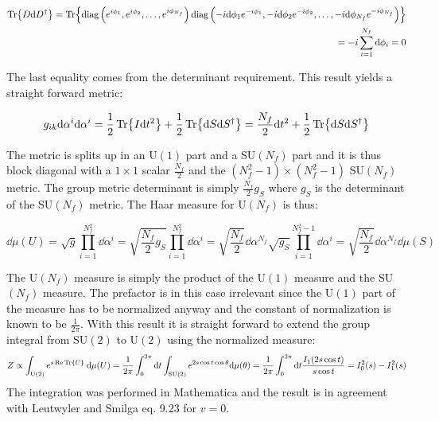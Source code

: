 \documentclass[a4,10pt,titlepage]{article}
\renewcommand\[{\begin{equation*}}
\renewcommand\]{\end{equation*}}
\newcommand{\be}{\begin{equation}}
\newcommand{\ee}{\end{equation}}
\numberwithin{equation}{section}
\newcommand{\lp}{\left}
\newcommand{\rp}{\right}
\newcommand{\half}{\frac{1}{2}}
\begin{document}
\be
\begin{split}
\Tr{D\dd D^\dagger}=\Tr{\text{diag}\lp(e^{i\phi_1},e^{i\phi_2},\ldots, e^{i\phi_{N_f}}\rp)\text{diag}\lp(-i\dd \phi_1 e^{-i\phi_1},-i\dd \phi_2 e^{-i\phi_2},\ldots, -i\dd \phi_{N_f}e^{-i\phi_{N_f}}\rp)} \\ 
=-i\sum_{i=1}^{N_f}\dd\phi_i=0
\end{split}
\ee

The last equality comes from the determinant requirement. This result yields a straight forward metric:

\be
g_{ik}\dd\alpha^i\dd\alpha^i=\half\Tr{I\dd t^2}+\half\Tr{\dd S\dd S^\dagger}=\frac{
N_f}{2}\dd t^2+\half\Tr{\dd S\dd S^\dagger}
\ee

The metric is splits up in an U$(1)$ part and a SU$(N_f)$ part and it is thus block diagonal with a $1\times1$ scalar $\frac{N_f}{2}$ and the $\lp(N_f^2-1\rp)\times\lp(N_f^2-1\rp)$ SU$(N_f)$ metric. The group metric determinant is simply $\frac{N_f}{2}g_{S}$ where $g_{S}$ is the determinant of the SU$(N_f)$ metric. The Haar measure for U$(N_f)$ is thus:

\be
\dd\mu(U)=\sqrt{g}\prod_{i=1}^{N_f^2}\dd\alpha^i=\sqrt{\frac{N_f}{2}g_{S}}\prod_{i=1}^{N_f^2}\dd\alpha^i=\sqrt{\frac{N_f}{2}}\dd\alpha^{N_f}\sqrt{g_S}\prod_{i=1}^{N_f^2-1}\dd\alpha^i=\sqrt{\frac{N_f}{2}}\dd\alpha^{N_f}\dd\mu\lp(S\rp)
\ee

The U$(N_f)$ measure is simply the product of the U$(1)$ measure and the SU$(N_f)$ measure. The prefactor is in this case irrelevant since the U$(1)$ part of the measure has to be normalized anyway and the constant of normalization is known to be $\frac{1}{2\pi}$. With this result it is straight forward to extend the group integral from SU$(2)$ to U$(2)$ using the normalized measure:
\begin{equation*}
Z\propto \int_{\text{U}(2)}e^{s\Re\Tr{U}}\:\dd\mu(U)=\frac{1}{2\pi}\int_0^{2\pi}\dd t\int_{\text{SU}(2)}e^{2s\cos{t}\cos{\theta}}\dd\mu(\theta)=\frac{1}{2\pi}\int_0^{2\pi}\dd t\frac{I_1(2s\cos{t})}{s\cos{t}}=I_0^2(s)-I_1^2(s)
\end{equation*}
The integration was performed in Mathematica and the result is in agreement with Leutwyler and Smilga eq. 9.23 for $v=0$.
\end{document}
